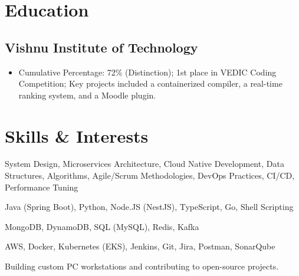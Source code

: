 \documentclass[11pt]{article}
\begin{document}
\section{Education}
\subsection{Vishnu Institute of Technology  }
\begin{itemize}[nosep, leftmargin=*]
    \item Cumulative Percentage: 72\% (Distinction); 1st place in VEDIC Coding Competition; Key projects included a containerized compiler, a real-time ranking system, and a Moodle plugin.
\end{itemize}

\section{Skills \& Interests}
\begin{description}[nosep, leftmargin=*, style=unboxed]
    \item[Core Competencies] System Design, Microservices Architecture, Cloud Native Development, Data Structures, Algorithms, Agile/Scrum Methodologies, DevOps Practices, CI/CD, Performance Tuning
    \item[Languages & Frameworks] Java (Spring Boot), Python, Node.JS (NestJS), TypeScript, Go, Shell Scripting
    \item[Databases \& Messaging] MongoDB, DynamoDB, SQL (MySQL), Redis, Kafka
    \item[Tools \& Platforms] AWS, Docker, Kubernetes (EKS), Jenkins, Git, Jira, Postman, SonarQube
    \item[Interests] Building custom PC workstations and contributing to open-source projects.
\end{description}
\end{document}
